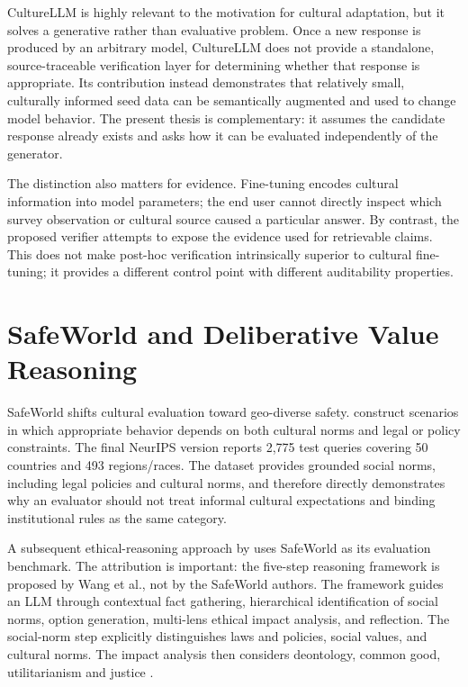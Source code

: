 CultureLLM is highly relevant to the motivation for cultural adaptation, but it solves a generative rather than evaluative problem. Once a new response is produced by an arbitrary model, CultureLLM does not provide a standalone, source-traceable verification layer for determining whether that response is appropriate. Its contribution instead demonstrates that relatively small, culturally informed seed data can be semantically augmented and used to change model behavior. The present thesis is complementary: it assumes the candidate response already exists and asks how it can be evaluated independently of the generator.

The distinction also matters for evidence. Fine-tuning encodes cultural information into model parameters; the end user cannot directly inspect which survey observation or cultural source caused a particular answer. By contrast, the proposed verifier attempts to expose the evidence used for retrievable claims. This does not make post-hoc verification intrinsically superior to cultural fine-tuning; it provides a different control point with different auditability properties.

\section{SafeWorld and Deliberative Value Reasoning}

SafeWorld shifts cultural evaluation toward geo-diverse safety. \textcite{yin2024safeworld} construct scenarios in which appropriate behavior depends on both cultural norms and legal or policy constraints. The final NeurIPS version reports 2,775 test queries covering 50 countries and 493 regions/races. The dataset provides grounded social norms, including legal policies and cultural norms, and therefore directly demonstrates why an evaluator should not treat informal cultural expectations and binding institutional rules as the same category.

A subsequent ethical-reasoning approach by \textcite{wang2025ethicalreasoning} uses SafeWorld as its evaluation benchmark. The attribution is important: the five-step reasoning framework is proposed by Wang et al., not by the SafeWorld authors. The framework guides an LLM through contextual fact gathering, hierarchical identification of social norms, option generation, multi-lens ethical impact analysis, and reflection. The social-norm step explicitly distinguishes laws and policies, social values, and cultural norms. The impact analysis then considers deontology, common good, utilitarianism and justice \parencite{wang2025ethicalreasoning}.

